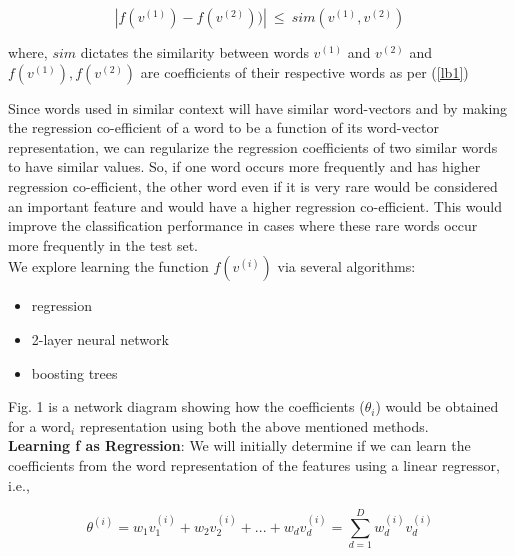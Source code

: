 \begin{equation}
|f(v^{(1)}) - f(v^{(2)}))|\ \leq\ sim(v^{(1)}, v^{(2)})
\end{equation}

where, $sim$ dictates the similarity between words $v^{(1)}$ and $v^{(2)}$ and $ f(v^{(1)}), f(v^{(2)})$ are coefficients of their respective words as per (\ref{lb1})


Since words used in similar context will have similar word-vectors and by making the regression co-efficient of a word to be a function of its word-vector representation, we can regularize the regression coefficients of two similar words to have similar values. So, if one word occurs more frequently and has higher regression co-efficient, the other word even if it is very rare would be considered an important feature and would have a higher regression co-efficient. This would improve the classification performance in cases where these rare words occur more frequently in the test set.\\



\noindent We explore learning the function $f(v^{(i)})$ via several algorithms:

\begin{itemize}
\item regression
\item 2-layer neural network
\item boosting trees
\end{itemize}

\noindent Fig. 1 is a network diagram showing how the coefficients ($\theta_{i}$) would be obtained for a word$_{i}$ representation using both the above mentioned methods.\\
\noindent\textbf{Learning f as Regression}: We will initially determine if we can learn the coefficients from the word representation of the features using a linear regressor, i.e., 

\begin{equation}
\theta^{(i)} = w_{1}v_{1}^{(i)} + w_{2}v_{2}^{(i)} + ... + w_{d}v_{d}^{(i)} = \sum_{d=1}^{D} w_{d}^{(i)}v_{d}^{(i)}
\end{equation}

